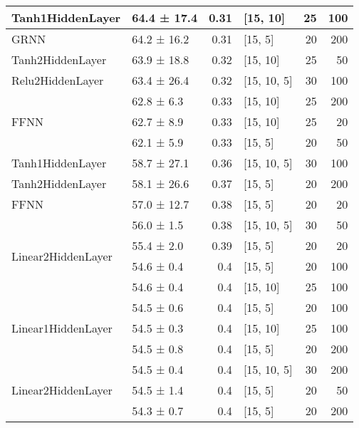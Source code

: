 \begin{table*}[h]
\begin{tabular}{llrlrr}
 \hline
Tanh1HiddenLayer         & 64.4 ± 17.4 &  0.31 & [15, 10]       &         25 &      100 \\
 \hline
GRNN         & 64.2 ± 16.2 &  0.31 & [15, 5]        &         20 &      200 \\
 \hline
Tanh2HiddenLayer         & 63.9 ± 18.8 &  0.32 & [15, 10]       &         25 &       50 \\
 \hline
Relu2HiddenLayer         & 63.4 ± 26.4 &  0.32 & [15, 10, 5]    &         30 &      100 \\
 \hline
\multirow{3}{*}{FFNN}         & 62.8 ± 6.3  &  0.33 & [15, 10]       &         25 &      200 \\
         & 62.7 ± 8.9  &  0.33 & [15, 10]       &         25 &       20 \\
         & 62.1 ± 5.9  &  0.33 & [15, 5]        &         20 &       50 \\
 \hline
Tanh1HiddenLayer         & 58.7 ± 27.1 &  0.36 & [15, 10, 5]    &         30 &      100 \\
 \hline
Tanh2HiddenLayer         & 58.1 ± 26.6 &  0.37 & [15, 5]        &         20 &      200 \\
 \hline
FFNN         & 57.0 ± 12.7 &  0.38 & [15, 5]        &         20 &       20 \\
 \hline
\multirow{4}{*}{Linear2HiddenLayer}         & 56.0 ± 1.5  &  0.38 & [15, 10, 5]    &         30 &       50 \\
         & 55.4 ± 2.0  &  0.39 & [15, 5]        &         20 &       20 \\
         & 54.6 ± 0.4  &  0.4  & [15, 5]        &         20 &      100 \\
         & 54.6 ± 0.4  &  0.4  & [15, 10]       &         25 &      100 \\
 \hline
\multirow{3}{*}{Linear1HiddenLayer}         & 54.5 ± 0.6  &  0.4  & [15, 5]        &         20 &      100 \\
         & 54.5 ± 0.3  &  0.4  & [15, 10]       &         25 &      100 \\
         & 54.5 ± 0.8  &  0.4  & [15, 5]        &         20 &      200 \\
 \hline
\multirow{4}{*}{Linear2HiddenLayer}         & 54.5 ± 0.4  &  0.4  & [15, 10, 5]    &         30 &      200 \\
         & 54.5 ± 1.4  &  0.4  & [15, 5]        &         20 &       50 \\
         & 54.3 ± 0.7  &  0.4  & [15, 5]        &         20 &      200 \\

\end{tabular}
\end{table*}

